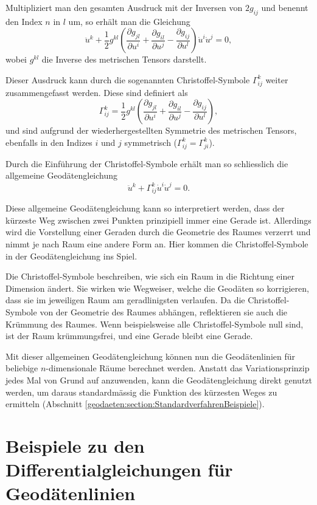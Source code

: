 Multipliziert man den gesamten Ausdruck mit der Inversen von $2g_{ij}$ und benennt den Index $n$ in $l$ um, so erhält man die Gleichung
\begin{equation}
	\ddot{u}^k + \frac{1}{2} g^{kl} \left( \frac{\partial g_{jl}}{\partial u^i} + \frac{\partial g_{il}}{\partial u^j} - \frac{\partial g_{ij}}{\partial u^l} \right) \dot{u}^i \dot{u}^j = 0,
\end{equation}
wobei $g^{kl}$ die Inverse des metrischen Tensors darstellt.

Dieser Ausdruck kann durch die sogenannten Christoffel-Symbole $\Gamma^k_{ij}$ weiter zusammengefasst werden.
Diese sind definiert als
\begin{equation}
	\Gamma^k_{ij} = \frac{1}{2} g^{kl} \left( \frac{\partial g_{jl}}{\partial u^i} + \frac{\partial g_{il}}{\partial u^j} - \frac{\partial g_{ij}}{\partial u^l} \right),
\end{equation}
und sind aufgrund der wiederhergestellten Symmetrie des metrischen Tensors, ebenfalls in den Indizes $i$ und $j$ symmetrisch ($\Gamma^k_{ij} = \Gamma^k_{ji}$).

Durch die Einführung der Christoffel-Symbole erhält man so schliesslich die allgemeine Geodätengleichung
\begin{equation}
	\ddot{u}^k + \Gamma^k_{ij} \dot{u}^i \dot{u}^j = 0.
	\label{geodaeten:equation:StandardverfahrenGeodaeten:Geodaetengleichung}
\end{equation}

Diese allgemeine Geodätengleichung kann so interpretiert werden, dass der kürzeste Weg zwischen zwei Punkten prinzipiell immer eine Gerade ist. 
Allerdings wird die Vorstellung einer Geraden durch die Geometrie des Raumes verzerrt und nimmt je nach Raum eine andere Form an. 
Hier kommen die Christoffel-Symbole in der Geodätengleichung ins Spiel.

Die Christoffel-Symbole beschreiben, wie sich ein Raum in die Richtung einer Dimension ändert.
Sie wirken wie Wegweiser, welche die Geodäten so korrigieren, dass sie im jeweiligen Raum am geradlinigsten verlaufen. 
Da die Christoffel-Symbole von der Geometrie des Raumes abhängen, reflektieren sie auch die Krümmung des Raumes.
Wenn beispielsweise alle Christoffel-Symbole null sind, ist der Raum krümmungsfrei, und eine Gerade bleibt eine Gerade.

Mit dieser allgemeinen Geodätengleichung können nun die Geodätenlinien für beliebige $n$-dimensionale Räume berechnet werden. 
Anstatt das Variationsprinzip jedes Mal von Grund auf anzuwenden, kann die Geodätengleichung direkt genutzt werden, um daraus standardmässig die Funktion des kürzesten Weges zu ermitteln (Abschnitt \ref{geodaeten:section:StandardverfahrenBeispiele}).

\section{Beispiele zu den Differentialgleichungen für Geodätenlinien 
\label{geodaeten:section:StandardverfahrenBeispiele}}




